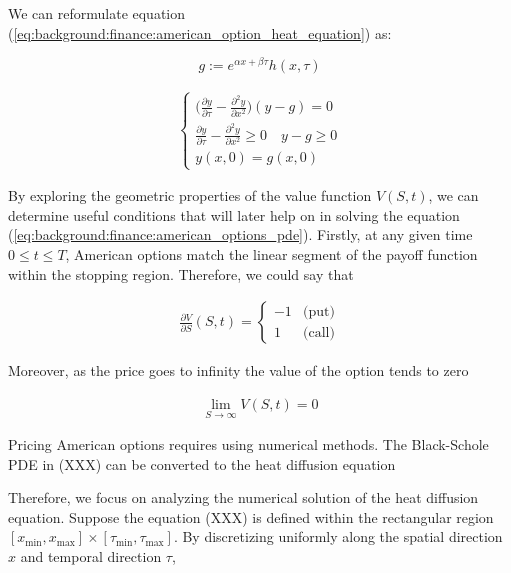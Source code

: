 We can reformulate equation (\ref*{eq:background:finance:american_option_heat_equation})
as:

\begin{equation}
  g := e^{\alpha x + \beta \tau}h(x, \tau)
\end{equation}

\begin{align}
  \begin{cases}
    \big(\frac{\partial y}{\partial \tau} - \frac{\partial^2 y}{\partial x^2}\big)(y  - g) =0 \\
    \frac{\partial y}{\partial \tau} - \frac{\partial^2 y}{\partial x^2} \ge 0 \quad y - g \ge 0 \\
    y(x, 0) = g(x, 0)
  \end{cases}
\end{align}


By exploring the geometric properties of the value function $V(S,t)$, 
we can determine useful conditions that will later help on in solving the equation 
(\ref*{eq:background:finance:american_options_pde}). Firstly, at
any given time $0 \le t \le T$, American options match the linear segment of the payoff
function within the stopping region. Therefore, we could say that 

\begin{align}
  \frac{\partial V}{\partial S}(S, t) =  \begin{cases}
    -1 & \text{(put)} \\ 
    1 & \text{(call)}
  \end{cases}
  \label{eq:background:finance:american_option_left_boundary}
\end{align}

Moreover, as the price goes to infinity the value of the option tends to zero

\begin{align}
  \lim_{S \rightarrow \infty}V(S, t) = 0 
  \label{eq:background:finance:american_option_stopping_right_boundary}
\end{align}



Pricing American options requires using numerical methods. The Black-Schole PDE 
in (XXX) can be converted to the heat diffusion equation


Therefore, we focus on analyzing the numerical solution of the heat diffusion equation. 
Suppose the equation (XXX) is defined within the rectangular region $[x_{\text{min}}, x_{\text{max}}]\times[\tau_{\text{min}}, \tau_{\text{max}}]$.
By discretizing uniformly along the spatial direction $x$ and temporal direction $\tau$,

